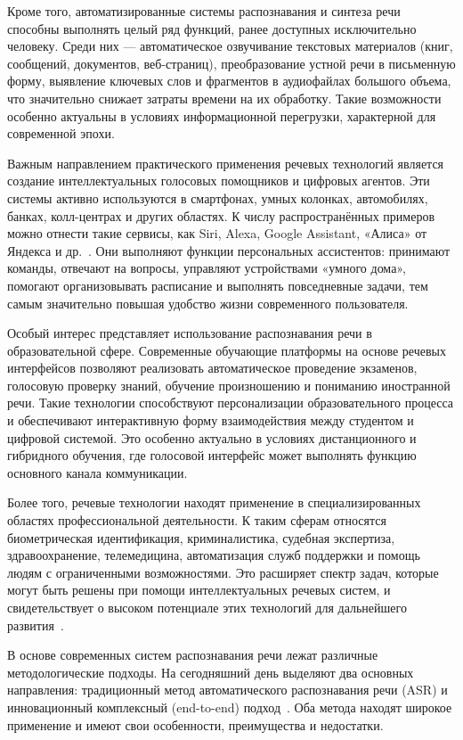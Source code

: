 Кроме того, автоматизированные системы распознавания и синтеза речи способны выполнять целый ряд функций, ранее доступных исключительно человеку. Среди них — автоматическое озвучивание текстовых материалов (книг, сообщений, документов, веб-страниц), преобразование устной речи в письменную форму, выявление ключевых слов и фрагментов в аудиофайлах большого объема, что значительно снижает затраты времени на их обработку. Такие возможности особенно актуальны в условиях информационной перегрузки, характерной для современной эпохи.

Важным направлением практического применения речевых технологий является создание интеллектуальных голосовых помощников и цифровых агентов. Эти системы активно используются в смартфонах, умных колонках, автомобилях, банках, колл-центрах и других областях. К числу распространённых примеров можно отнести такие сервисы, как Siri, Alexa, Google Assistant, «Алиса» от Яндекса и др.~\cite{Hein}. Они выполняют функции персональных ассистентов: принимают команды, отвечают на вопросы, управляют устройствами «умного дома», помогают организовывать расписание и выполнять повседневные задачи, тем самым значительно повышая удобство жизни современного пользователя.

Особый интерес представляет использование распознавания речи в образовательной сфере. Современные обучающие платформы на основе речевых интерфейсов позволяют реализовать автоматическое проведение экзаменов, голосовую проверку знаний, обучение произношению и пониманию иностранной речи. Такие технологии способствуют персонализации образовательного процесса и обеспечивают интерактивную форму взаимодействия между студентом и цифровой системой. Это особенно актуально в условиях дистанционного и гибридного обучения, где голосовой интерфейс может выполнять функцию основного канала коммуникации.

Более того, речевые технологии находят применение в специализированных областях профессиональной деятельности. К таким сферам относятся биометрическая идентификация, криминалистика, судебная экспертиза, здравоохранение, телемедицина, автоматизация служб поддержки и помощь людям с ограниченными возможностями. Это расширяет спектр задач, которые могут быть решены при помощи интеллектуальных речевых систем, и свидетельствует о высоком потенциале этих технологий для дальнейшего развития~\cite{Muravyov}.

В основе современных систем распознавания речи лежат различные методологические подходы. На сегодняшний день выделяют два основных направления: традиционный метод автоматического распознавания речи (ASR) и инновационный комплексный (end-to-end) подход~\cite{Riqiang}. Оба метода находят широкое применение и имеют свои особенности, преимущества и недостатки.

